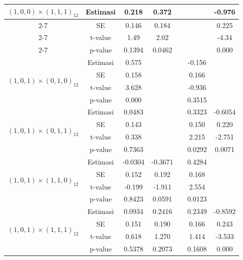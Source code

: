 \begin{enumerate}[label=\alph*.]
\begin{longtable}{|c|c|c|c|c|c|c|}
            \multirow{4}{*}{$(1,0,0)\times(1,1,1)_{12}$}
            & Estimasi & 0.218 & 0.372 &  &  & -0.976 \\ \cline{2-7}
            & SE       & 0.146 & 0.184 &  &  & 0.225  \\ \cline{2-7}
            & t-value  & 1.49  & 2.02  &  &  & -4.34 \\ \cline{2-7}
            & p-value  & 0.1394 & 0.0462 &  &  & 0.000  \\ \hline

            \multirow{4}{*}{$(1,0,1)\times(0,1,0)_{12}$}
            & Estimasi & 0.575 &  &  & -0.156 &  \\ \cline{2-7}
            & SE       & 0.158 &  &  & 0.166  &  \\ \cline{2-7}
            & t-value  & 3.628 &  &  & -0.936 &  \\ \cline{2-7}
            & p-value  & 0.000 &  &  & 0.3515 &  \\ \hline

            \multirow{4}{*}{$(1,0,1)\times(0,1,1)_{12}$}
            & Estimasi & 0.0483 &  &  & 0.3323 & -0.6054 \\ \cline{2-7}
            & SE       & 0.143  &  &  & 0.150  & 0.220  \\ \cline{2-7}
            & t-value  & 0.338  &  &  & 2.215  & -2.751 \\ \cline{2-7}
            & p-value  & 0.7363 &  &  & 0.0292 & 0.0071 \\ \hline

            \multirow{4}{*}{$(1,0,1)\times(1,1,0)_{12}$}
            & Estimasi & -0.0304 & -0.3671 &  & 0.4284 &  \\ \cline{2-7}
            & SE       & 0.152   & 0.192   &  & 0.168  &  \\ \cline{2-7}
            & t-value  & -0.199  & -1.911  &  & 2.554  &  \\ \cline{2-7}
            & p-value  & 0.8423  & 0.0591  &  & 0.0123 &  \\ \hline

            \multirow{4}{*}{$(1,0,1)\times(1,1,1)_{12}$}
            & Estimasi & 0.0934 & 0.2416 &  & 0.2349 & -0.8592 \\ \cline{2-7}
            & SE       & 0.151  & 0.190  &  & 0.166  & 0.243  \\ \cline{2-7}
            & t-value  & 0.618  & 1.270  &  & 1.414  & -3.533 \\ \cline{2-7}
            & p-value  & 0.5378 & 0.2073 &  & 0.1608 & 0.000  \\ \hline


\end{longtable}
\end{enumerate}
